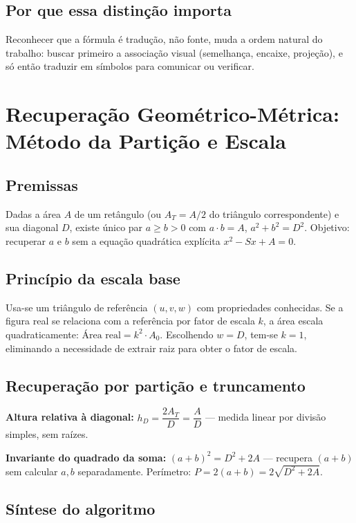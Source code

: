 \documentclass[11pt,a4paper]{article}
\begin{document}
\subsection{Por que essa distinção importa}

Reconhecer que a fórmula é tradução, não fonte, muda a ordem natural do trabalho: buscar primeiro a associação visual (semelhança, encaixe, projeção), e só então traduzir em símbolos para comunicar ou verificar.

\section{Recuperação Geométrico-Métrica: Método da Partição e Escala}

\subsection{Premissas}

Dadas a área $A$ de um retângulo (ou $A_T = A/2$ do triângulo correspondente) e sua diagonal $D$, existe único par $a \ge b > 0$ com $a \cdot b = A$, $a^2+b^2=D^2$. Objetivo: recuperar $a$ e $b$ sem a equação quadrática explícita $x^2 - Sx + A = 0$.

\subsection{Princípio da escala base}

Usa-se um triângulo de referência $(u,v,w)$ com propriedades conhecidas. Se a figura real se relaciona com a referência por fator de escala $k$, a área escala quadraticamente: $\text{Área real} = k^2 \cdot A_0$. Escolhendo $w=D$, tem-se $k=1$, eliminando a necessidade de extrair raiz para obter o fator de escala.

\subsection{Recuperação por partição e truncamento}

\textbf{Altura relativa à diagonal:} $h_D = \dfrac{2A_T}{D} = \dfrac{A}{D}$ --- medida linear por divisão simples, sem raízes.

\textbf{Invariante do quadrado da soma:} $(a+b)^2 = D^2 + 2A$ --- recupera $(a+b)$ sem calcular $a,b$ separadamente. Perímetro: $P = 2(a+b) = 2\sqrt{D^2+2A}$.

\subsection{Síntese do algoritmo}
\end{document}
